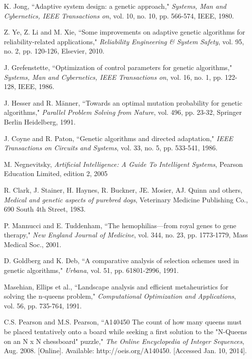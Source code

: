 \documentclass[conference]{IEEEtran}
\begin{document}
\begin{thebibliography}{24}
 K. Jong, ``Adaptive system design: a genetic approach,"
        {\it Systems, Man and Cybernetics, IEEE Transactions on}, vol. 10, no. 10, pp. 566-574, IEEE, 1980.

 Z. Ye, Z. Li and M. Xie, ``Some improvements on adaptive genetic algorithms for reliability-related applications,"
        {\it Reliability Engineering \& System Safety}, vol. 95, no. 2, pp. 120-126, Elsevier, 2010.

 J. Grefenstette, ``Optimization of control parameters for genetic algorithms,"
        {\it Systems, Man and Cybernetics, IEEE Transactions on}, vol. 16, no. 1, pp. 122-128, IEEE, 1986.

 J. Hesser and R. M{\"a}nner, ``Towards an optimal mutation probability for genetic algorithms,"
        {\it Parallel Problem Solving from Nature}, vol. 496, pp. 23-32, Springer Berlin Heidelberg, 1991.

 J. Coyne and R. Paton, ``Genetic algorithms and directed adaptation,"
        {\it IEEE Transactions on Circuits and Systems}, vol. 33, no. 5, pp. 533-541, 1986.

 M. Negnevitsky,
        {\it Artificial Intelligence: A Guide To Intelligent Systems}, Pearson Education Limited, edition 2, 2005


 R. Clark, J. Stainer, H. Haynes, R. Buckner, JE. Mosier, AJ. Quinn and others,
        {\it Medical and genetic aspects of purebred dogs}, Veterinary Medicine Publishing Co., 690 South 4th Street, 1983.


 P. Mannucci and E. Tuddenham, ``The hemophilias—from royal genes to gene therapy,"
        {\it New England Journal of Medicine}, vol. 344, no. 23, pp. 1773-1779, Mass Medical Soc., 2001.

 D. Goldberg and K. Deb, ``A comparative analysis of selection schemes used in genetic algorithms,"
        {\it Urbana}, vol. 51, pp. 61801-2996, 1991.

 Masehian, Ellips et al., ``Landscape analysis and efficient metaheuristics for solving the n-queens problem,"
        {\it Computational Optimization and Applications}, vol. 56, pp. 735-764, 1991.


 C.S. Pearson and M.S. Pearson, ``A140450 The count of how many queens must be placed tentatively onto a board while seeking a first solution to the "N-Queens on an N x N chessboard" puzzle,"
        {\it The Online Encyclopedia of Integer Sequences}, Aug. 2008. [Online]. Available: http://oeis.org/A140450. [Accessed Jan. 10, 2014].
        

\end{thebibliography}
\end{document}
